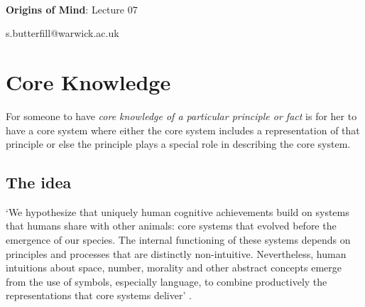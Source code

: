\documentclass[12pt]{extarticle}
\date{}
\makeatletter
\def \ititle {Origins of Mind}
\def \isubtitle {Lecture 07}
\def \iemail{s.butterfill@warwick.ac.uk}
\makeatother
\begin{document}
\begin{multicols}{3}

\setlength\footnotesep{1em}








\def \ititle {Origins of Mind}
 
\def \isubtitle {Lecture 07}
 
 
 
\
 
 
 
\begin{center}
 
{\Large
 
\textbf{\ititle}: \isubtitle
 
}
 
 
 
\iemail %
 
\end{center}
 
 
 
\section{Core Knowledge}
 
For someone to have \textit{core knowledge of a particular principle or fact} is for her to have a core system where either the core system includes a representation of that principle or else the principle plays a special role in describing the core system.
 
\subsection{The idea}
 
‘We hypothesize that uniquely human cognitive achievements build on systems that humans share with other animals: core systems that evolved before the emergence of our species.
The internal functioning of these systems depends on principles and processes that are distinctly non-intuitive.
Nevertheless, human intuitions about space, number, morality and other abstract concepts emerge from the use of symbols, especially language, to combine productively the representations that core systems deliver’
\citep[pp.\ 2784-5]{spelke:2012_core}.
 

\end{multicols}
\end{document}
